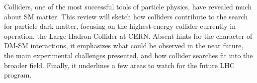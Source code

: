 Colliders, one of the most successful tools of particle physics, have revealed much about SM matter.
This review will sketch how colliders contribute to the search for particle dark matter, focusing on the highest-energy collider currently in operation, the Large Hadron Collider at CERN.
Absent hints for the character of DM-SM interactions, it emphasizes what could be observed in the near future, the main experimental challenges presented, and how collider searches fit into the broader field.
Finally, it underlines a few areas to watch for the future LHC program.

